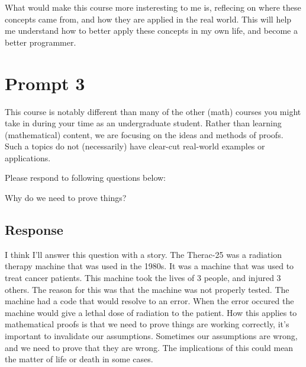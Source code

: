 \documentclass{article}
\begin{document}
What would make this course more insteresting to me is, reflecing on where these concepts came from, and how they 
are applied in the real world. This will help me understand how to better apply these concepts in my own life, and 
become a better programmer. 

\section{Prompt 3}

This course is notably different than many of the other (math) courses you might take in
during your time as an undergraduate student. Rather than learning (mathematical) content, we are focusing on the ideas and methods of proofs. Such a topics do not (necessarily)
have clear-cut real-world examples or applications.
\newline

Please respond to following questions below:
\newline

Why do we need to prove things?

\subsection{Response}
I think I'll answer this question with a story. The Therac-25 was a radiation therapy machine that was used in the 1980s.
It was a machine that was used to treat cancer patients. This machine took the lives of 3 people, and injured 3 others. The reason for this was that the machine was not properly tested.
The machine had a code that would resolve to an error. When the error occured the machine would give a lethal dose of radiation to the patient.
How this applies to mathematical proofs is that we need to prove things are working correctly, it's important to invalidate our assumptions. Sometimes
our assumptions are wrong, and we need to prove that they are wrong. The implications of this could mean the matter of life or death in some cases. 
\end{document}

